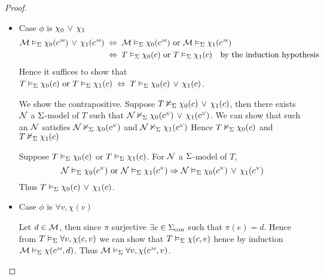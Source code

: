 \begin{proof}
\begin{itemize}
        \item Case $\phi$ is $\chi_0 \, \lor \, \chi_1$
            \begin{align*}
                \MM \model{\Si} \chi_0(\mmintp{c}) \OR \chi_1(\mmintp{c}) 
                    &\;\iff\; \MM \model{\Si} \chi_0(\mmintp{c}) 
                    \text{ or } \MM \model{\Si} \chi_1(\mmintp{c}) \\
                    &\;\iff\; T \model{\Si} \chi_0(c) \text{ or } T \model{\Si} \chi_1(c) 
                    \text{\quad by the induction hypothesis}
            \end{align*}
            Hence it suffices to show that 
            $T \vDash_{\Sigma} \chi_0(c) \text{ or } T \vDash_{\Sigma} \chi_1(c) 
            \;\Leftrightarrow\; T \vDash_{\Sigma} \chi_0(c) \, \lor \, \chi_1(c)$.
            \begin{forward}
                We show the contrapositive.
                Suppose $T \nvDash_{\Sigma} \chi_0(c) \, \lor \, \chi_1(c)$,
                then there exists $\mathcal{N}$ a $\Sigma$-model of $T$ such that 
                $\NN \nodel{\Si} \chi_0(\nnintp{c}) \OR \chi_1(\nnintp{c})$.
                We can show that such an $\mathcal{N}$ satisfies 
                $\NN \nodel{\Si} \chi_0(\nnintp{c})$ and $\NN \nodel{\Si} \chi_1(\nnintp{c})$
                Hence $T \nvDash_{\Sigma} \chi_0(c)$ and $T \nvDash_{\Sigma} \chi_1(c)$
            \end{forward}

            \begin{backward}
                Suppose $T \vDash_{\Sigma} \chi_0(c)$ or 
                $T \vDash_{\Sigma} \chi_1(c)$.
                For $\mathcal{N}$ a $\Sigma$-model of $T$,
                \[\NN \model{\Si} \chi_0(\nnintp{c}) \text{ or } 
                \NN \model{\Si} \chi_1(\nnintp{c}) 
                \implies \NN \model{\Si} \chi_0(\nnintp{c}) \OR \chi_1(\nnintp{c})\]
                Thus $T \vDash_{\Sigma} \chi_0(c) \, \lor \, \chi_1(c)$.
            \end{backward}

        \item Case $\phi$ is $\forall v, \chi(v)$ 
            \begin{forward}
                Let $d \in {\mathcal{M}}$, 
                then since $\pi$ surjective $\exists e \in {\Sigma}_\mathrm{con}$
                such that $\pi(e) = d$.
                Hence from $T \vDash_{\Sigma} \forall v, \chi(c,v)$ 
                we can show that $T \vDash_{\Sigma} \chi(c,e)$
                hence by induction $\MM \model{\Si} \chi(\mmintp{c},d)$.
                Thus $\MM \model{\Si} \forall v, \chi(\mmintp{c},v)$.
            \end{forward}


\end{itemize}
\end{proof}
